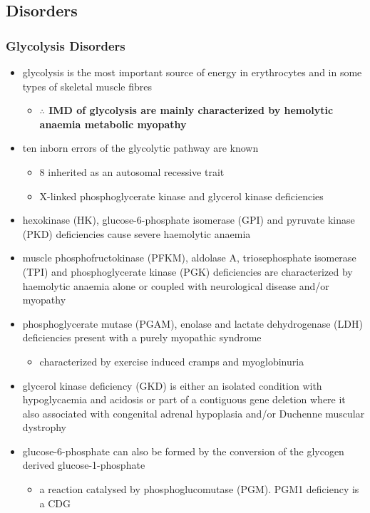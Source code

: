 \documentclass{scrartcl}
\begin{document}
\subsection{Disorders}
\label{sec:org95c298c}
\subsubsection{Glycolysis Disorders}
\label{sec:orgee0e36f}
\begin{itemize}
\item glycolysis is the most important source of energy in erythrocytes
and in some types of skeletal muscle fibres

\begin{itemize}
\item \textbf{\(\therefore\) IMD of glycolysis are mainly characterized by hemolytic}
\textbf{anaemia \textpm{} metabolic myopathy}
\end{itemize}

\item ten inborn errors of the glycolytic pathway are known
\begin{itemize}
\item 8 inherited as an autosomal recessive trait
\item X-linked phosphoglycerate kinase and glycerol kinase deficiencies
\end{itemize}

\item hexokinase (HK), glucose-6-phosphate isomerase (GPI) and pyruvate
kinase (PKD) deficiencies cause severe haemolytic anaemia

\item muscle phosphofructokinase (PFKM), aldolase A, triosephosphate
isomerase (TPI) and phosphoglycerate kinase (PGK) deficiencies are
characterized by haemolytic anaemia alone or coupled with
neurological disease and/or myopathy

\item phosphoglycerate mutase (PGAM), enolase and lactate dehydrogenase
(LDH) deficiencies present with a purely myopathic syndrome
\begin{itemize}
\item characterized by exercise induced cramps and myoglobinuria
\end{itemize}

\item glycerol kinase deficiency (GKD) is either an isolated condition
with hypoglycaemia and acidosis or part of a contiguous
gene deletion where it also associated with congenital adrenal
hypoplasia and/or Duchenne muscular dystrophy

\item glucose-6-phosphate can also be formed by the conversion of the
glycogen derived glucose-1-phosphate

\begin{itemize}
\item a reaction catalysed by
phosphoglucomutase (PGM). PGM1 deficiency is a CDG
\end{itemize}
\end{itemize}
\end{document}
